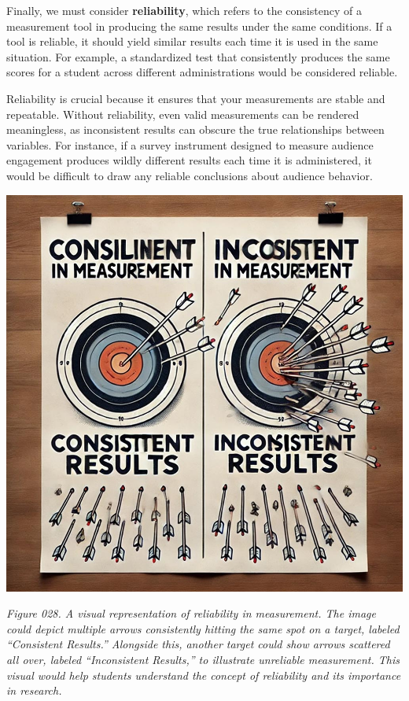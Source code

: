 \documentclass[
]{book}
\begin{document}
Finally, we must consider \textbf{reliability}, which refers to the consistency of a measurement tool in producing the same results under the same conditions. If a tool is reliable, it should yield similar results each time it is used in the same situation. For example, a standardized test that consistently produces the same scores for a student across different administrations would be considered reliable.

Reliability is crucial because it ensures that your measurements are stable and repeatable. Without reliability, even valid measurements can be rendered meaningless, as inconsistent results can obscure the true relationships between variables. For instance, if a survey instrument designed to measure audience engagement produces wildly different results each time it is administered, it would be difficult to draw any reliable conclusions about audience behavior.

\includegraphics[width=1\textwidth,height=\textheight]{images/fig028.jpg}

\emph{Figure 028. A visual representation of reliability in measurement. The image could depict multiple arrows consistently hitting the same spot on a target, labeled ``Consistent Results.'' Alongside this, another target could show arrows scattered all over, labeled ``Inconsistent Results,'' to illustrate unreliable measurement. This visual would help students understand the concept of reliability and its importance in research.}
\end{document}
